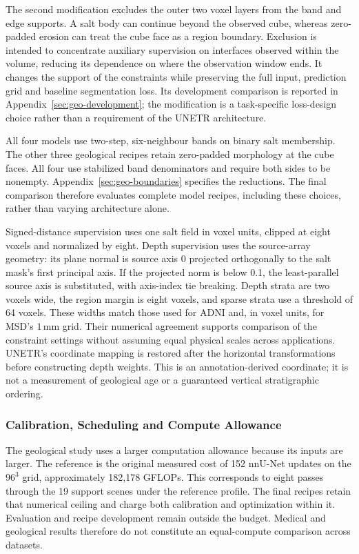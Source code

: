 \documentclass[12pt,a4paper]{article}
\begin{document}
The second modification excludes the outer two voxel layers from the
band and edge supports. A salt body can continue beyond the observed
cube, whereas zero-padded erosion can treat the cube face as a region
boundary. Exclusion is intended to concentrate auxiliary supervision
on interfaces observed within the volume, reducing its dependence on
where the observation window ends. It changes the support of the
constraints while preserving the full input, prediction grid and
baseline segmentation loss. Its development comparison is reported in
Appendix~\ref{sec:geo-development}; the modification is a task-specific
loss-design choice rather than a requirement of the UNETR architecture.

All four models use two-step, six-neighbour bands on binary salt
membership. The other three geological recipes retain zero-padded
morphology at the cube faces. All four use stabilized band denominators
and require both sides to be nonempty.
Appendix~\ref{sec:geo-boundaries} specifies the reductions. The final
comparison therefore evaluates complete model recipes, including these
choices, rather than varying architecture alone.

Signed-distance supervision uses one salt field in voxel units, clipped
at eight voxels and normalized by eight. Depth supervision uses the
source-array geometry: its plane normal is source axis 0 projected
orthogonally to the salt mask's first principal axis. If the projected
norm is below 0.1, the least-parallel source axis is substituted, with
axis-index tie breaking. Depth strata are two voxels wide, the region
margin is eight voxels, and sparse strata use a threshold of 64 voxels.
These widths match those used for ADNI and, in voxel units, for MSD's
$1\,\mathrm{mm}$ grid. Their numerical agreement supports comparison of
the constraint settings without assuming equal physical scales across
applications.
UNETR's coordinate mapping is restored after the horizontal transformations before
constructing depth weights. This is an annotation-derived coordinate;
it is not a measurement of geological age or a guaranteed vertical
stratigraphic ordering.

\subsubsection{Calibration, Scheduling and Compute Allowance}

The geological study uses a larger computation allowance because its
inputs are larger. The reference is the original measured cost of 152
nnU-Net updates on the $96^3$ grid, approximately 182,178 GFLOPs. This
corresponds to eight passes through the 19 support scenes under the
reference profile. The final recipes retain that numerical ceiling and
charge both calibration and optimization within it. Evaluation and recipe
development remain outside the budget. Medical and geological results
therefore do not constitute an equal-compute comparison across datasets.
\end{document}
